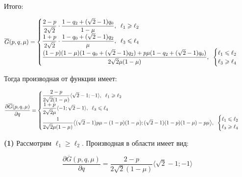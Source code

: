 \begin{flushleft}
	Итого: 
	
	$$
	\overline G(p,q,\mu) =		
	\begin{cases}
		\dfrac{2-p}{2\sqrt{2}}\cdot\dfrac{1-q_2+(\sqrt{2}-1)q_0}{1-\mu} 
		,\hspace{2mm} \ell_1 \geqslant \ell_2		
		\\
		\dfrac{1+p}{2\sqrt{2}}\cdot\dfrac{1-q_0+(\sqrt{2}-1)q_2}{\mu}
		,\hspace{2mm} \ell_3 \leqslant \ell_4\\
		\dfrac{(1-p)(1-\mu)(1-q_0+(\sqrt{2}-1)q_2)+p\mu(1-q_2+(\sqrt{2}-1)q_0)}
		{2\sqrt{2}\mu(1-\mu)}
		,\hspace{2mm}
		\begin{cases}
			\ell_1 \leqslant \ell_2\\
			\ell_3 \geqslant \ell_4\\
		\end{cases}
	\end{cases}
	$$	
	
	Тогда производная от функции имеет:
	
	$$
	\frac{\partial \overline{G}(p,q,\mu)}{\partial q}=
	\begin{cases}
		\dfrac{2-p}{2\sqrt{2}(1-\mu)} \langle \sqrt{2}-1; -1 \rangle 
 		,\hspace{2mm}
 		\ell_1 \geqslant \ell_2\\
		
		\dfrac{1+p}{2\sqrt{2}\mu} \langle -1; \sqrt{2}-1 \rangle
		,\hspace{2mm}
		\ell_3 \leqslant \ell_4\\
		
		\dfrac{1}{2\sqrt{2}\mu(1-\mu)}
		\big \langle 
			(\sqrt{2} - 1)p\mu -(1-p)(1-\mu);
			(\sqrt{2} - 1)(1-p)(1-\mu) - p\mu			
		\big \rangle
		,\hspace{2mm}
		\begin{cases}
			\ell_1 \leqslant \ell_2\\
			\ell_3 \geqslant \ell_4\\
		\end{cases}
	\end{cases}
	$$
	

	\textbf{(1)} Рассмотрим $\ell_1 \geqslant \ell_2$. 
	Производная в области имеет вид:
	
	$$\frac{\partial \overline{G}(p,q,\mu)}{\partial q}=
	\frac{2-p}{2\sqrt{2}(1-\mu)} \langle \sqrt{2}-1; -1 \rangle$$
 	

\end{flushleft}
